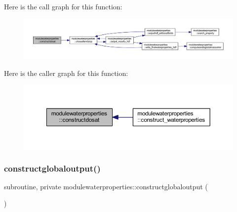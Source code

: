 Here is the call graph for this function\+:\nopagebreak
\begin{figure}[H]
\begin{center}
\leavevmode
\includegraphics[width=350pt]{namespacemodulewaterproperties_ad828152e0a7f6fd60ca0cd045955a56b_cgraph}
\end{center}
\end{figure}
Here is the caller graph for this function\+:\nopagebreak
\begin{figure}[H]
\begin{center}
\leavevmode
\includegraphics[width=350pt]{namespacemodulewaterproperties_ad828152e0a7f6fd60ca0cd045955a56b_icgraph}
\end{center}
\end{figure}
\mbox{\label{namespacemodulewaterproperties_aef6113e740cce05ecfdab1fee63873df}} 
\subsubsection{\texorpdfstring{constructglobaloutput()}{constructglobaloutput()}}
{\footnotesize\ttfamily subroutine, private modulewaterproperties\+::constructglobaloutput (\begin{DoxyParamCaption}{ }\end{DoxyParamCaption})\hspace{0.3cm}{\ttfamily [private]}}

